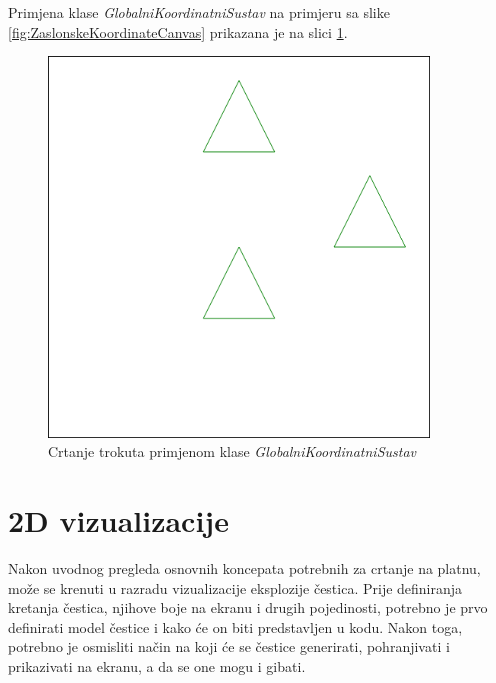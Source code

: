 \documentclass{foi}
\begin{document}
Primjena klase \textit{GlobalniKoordinatniSustav} na primjeru sa slike \ref{fig:ZaslonskeKoordinateCanvas} prikazana je na slici \ref{fig:TransformiraniTrokutiCanvas}.

\begin{figure}[H]
    \centering
    \includegraphics[width=0.9\textwidth]{slike/8_TransformiraniTrokutiCanvas.png}
    \captionsetup{justification=centering}
    \caption{Crtanje trokuta primjenom klase \textit{GlobalniKoordinatniSustav}}
\label{fig:TransformiraniTrokutiCanvas}
\end{figure}

\chapter{2D vizualizacije}
Nakon uvodnog pregleda osnovnih koncepata potrebnih za crtanje na platnu, može se krenuti u razradu vizualizacije eksplozije čestica. Prije definiranja kretanja čestica, njihove boje na ekranu i drugih pojedinosti, potrebno je prvo definirati model čestice i kako će on biti predstavljen u kodu. Nakon toga, potrebno je osmisliti način na koji će se čestice generirati, pohranjivati i prikazivati na ekranu, a da se one mogu i gibati. 
\end{document}
